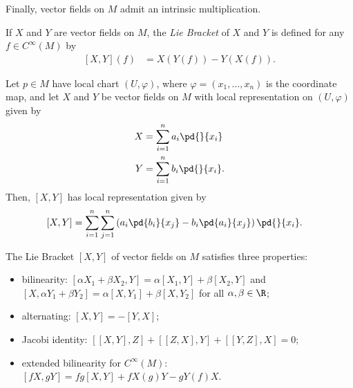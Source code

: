 \documentclass[10pt]{mypackage}
\begin{document}
Finally, vector fields on $M$ admit an intrinsic multiplication.
\begin{definition}
  If $X$ and $Y$ are vector fields on $M$, the \textit{Lie Bracket} of $X$ and $Y$ is defined for any $f\in C^{\infty}\left( M \right)$ by
  \begin{align*}
    \left[ X,Y \right]\left( f \right) &= X\left(Y\left(f\right)\right) - Y\left( X\left( f \right) \right).
  \end{align*}
\end{definition}
\begin{proposition}
  Let $p\in M$ have local chart $\left( U,\varphi \right)$, where $\varphi = \left( x_1,\dots,x_n \right)$ is the coordinate map, and let $X$ and $Y$ be vector fields on $M$ with local representation on $\left( U,\varphi \right)$ given by
  \begin{align*}
    X &= \sum_{i=1}^{n} a_i \pd{}{x_i}\\
    Y &= \sum_{i=1}^{n} b_i \pd{}{x_i}.
  \end{align*}
  Then, $\left[ X,Y \right]$ has local representation given by
  \begin{align*}
    \left[ X,Y \right] &= \sum_{i=1}^{n}\sum_{j=1}^{n} \left( a_i \pd{b_i}{x_j} - b_i \pd{a_i}{x_j} \right) \pd{}{x_i}.
  \end{align*}
\end{proposition}
\begin{proposition}
  The Lie Bracket $\left[ X,Y \right]$ of vector fields on $M$ satisfies three properties:
  \begin{itemize}
    \item bilinearity: $\left[ \alpha X_1 + \beta X_2 ,Y \right] = \alpha\left[ X_1,Y \right] + \beta \left[ X_2,Y \right]$ and $\left[ X,\alpha Y_1 + \beta Y_2 \right] = \alpha \left[ X,Y_1 \right] + \beta \left[ X,Y_2 \right]$ for all $\alpha,\beta\in \R$;
    \item alternating: $\left[ X,Y \right] = -\left[ Y,X \right]$;
    \item Jacobi identity: $\left[ \left[ X,Y \right],Z \right] + \left[ \left[ Z,X \right],Y \right] + \left[ \left[ Y,Z \right],X \right] = 0$;
    \item extended bilinearity for $C^{\infty}\left( M \right)$: $\left[ fX,gY \right] = fg\left[ X,Y \right] + fX\left( g \right)Y - gY\left( f \right)X$.
  \end{itemize}
\end{proposition}
\end{document}
